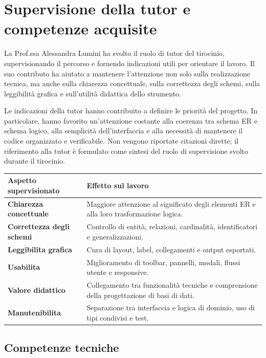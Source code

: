 \documentclass{unipd-thesis-modern}
\begin{document}
\chapter{Supervisione della tutor e competenze acquisite}

La Prof.ssa Alessandra Lumini ha svolto il ruolo di tutor del tirocinio, supervisionando il percorso e fornendo indicazioni utili per orientare il lavoro. Il suo contributo ha aiutato a mantenere l'attenzione non solo sulla realizzazione tecnica, ma anche sulla chiarezza concettuale, sulla correttezza degli schemi, sulla leggibilità grafica e sull'utilità didattica dello strumento.

Le indicazioni della tutor hanno contribuito a definire le priorità del progetto. In particolare, hanno favorito un'attenzione costante alla coerenza tra schema ER e schema logico, alla semplicità dell'interfaccia e alla necessità di mantenere il codice organizzato e verificabile. Non vengono riportate citazioni dirette; il riferimento alla tutor è formulato come sintesi del ruolo di supervisione svolto durante il tirocinio.

\begin{table}[htbp]
\centering
\small
\begin{tabularx}{\textwidth}{>{\bfseries}p{3.8cm}X}
\toprule
Aspetto supervisionato & Effetto sul lavoro \\
\midrule
Chiarezza concettuale & Maggiore attenzione al significato degli elementi ER e alla loro trasformazione logica. \\
Correttezza degli schemi & Controllo di entità, relazioni, cardinalità, identificatori e generalizzazioni. \\
Leggibilita grafica & Cura di layout, label, collegamenti e output esportati. \\
Usabilita & Miglioramento di toolbar, pannelli, modali, flussi utente e responsive. \\
Valore didattico & Collegamento tra funzionalità tecniche e comprensione della progettazione di basi di dati. \\
Manutenibilita & Separazione tra interfaccia e logica di dominio, uso di tipi condivisi e test. \\
\bottomrule
\end{tabularx}
\end{table}

\section{Competenze tecniche}
\end{document}
